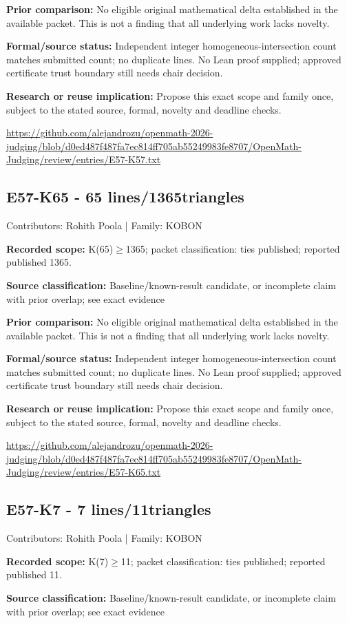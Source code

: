 \documentclass[11pt,a4paper]{article}
\begin{document}
\textbf{Prior comparison:} No eligible original mathematical delta established in the available packet. This is not a finding that all underlying work lacks novelty.

\textbf{Formal/source status:} Independent integer homogeneous-intersection count matches submitted count; no duplicate lines. No Lean proof supplied; approved certificate trust boundary still needs chair decision.

\textbf{Research or reuse implication:} Propose this exact scope and family once, subject to the stated source, formal, novelty and deadline checks.

{\small \url{https://github.com/alejandrozu/openmath-2026-judging/blob/d0ed487f487fa7ec814ff705ab55249983fe8707/OpenMath-Judging/review/entries/E57-K57.txt}\par}

\begin{samepage}
\subsection{E57-K65  -  65 lines/1365triangles}
{\small Contributors: Rohith Poola | Family: KOBON\par}

\textbf{Recorded scope:} K(65)\ensuremath{\geq}1365; packet classification: ties published; reported published 1365.

\end{samepage}
\textbf{Source classification:} Baseline/known-result candidate, or incomplete claim with prior overlap; see exact evidence

\textbf{Prior comparison:} No eligible original mathematical delta established in the available packet. This is not a finding that all underlying work lacks novelty.

\textbf{Formal/source status:} Independent integer homogeneous-intersection count matches submitted count; no duplicate lines. No Lean proof supplied; approved certificate trust boundary still needs chair decision.

\textbf{Research or reuse implication:} Propose this exact scope and family once, subject to the stated source, formal, novelty and deadline checks.

{\small \url{https://github.com/alejandrozu/openmath-2026-judging/blob/d0ed487f487fa7ec814ff705ab55249983fe8707/OpenMath-Judging/review/entries/E57-K65.txt}\par}

\begin{samepage}
\subsection{E57-K7  -  7 lines/11triangles}
{\small Contributors: Rohith Poola | Family: KOBON\par}

\textbf{Recorded scope:} K(7)\ensuremath{\geq}11; packet classification: ties published; reported published 11.

\end{samepage}
\textbf{Source classification:} Baseline/known-result candidate, or incomplete claim with prior overlap; see exact evidence
\end{document}
